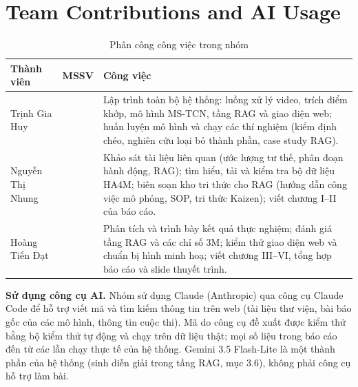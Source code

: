 \section{Team Contributions and AI Usage}

\begin{table}[H]
\centering
\caption{Phân công công việc trong nhóm}
\small
\setlength{\tabcolsep}{3pt}\renewcommand{\arraystretch}{1.15}
\begin{tabular}{@{}>{\raggedright\arraybackslash}p{}>{\centering\arraybackslash}p{}>{\raggedright\arraybackslash}p{}@{}}
\toprule
\textbf{Thành viên} & \textbf{MSSV} & \textbf{Công việc} \\\midrule
Trịnh Gia Huy & 23010069 & Lập trình toàn bộ hệ thống: luồng xử lý video, trích điểm khớp, mô hình MS-TCN, tầng RAG và giao diện web; huấn luyện mô hình và chạy các thí nghiệm (kiểm định chéo, nghiên cứu loại bỏ thành phần, case study RAG). \\
Nguyễn Thị Nhung & 23010607 & Khảo sát tài liệu liên quan (ước lượng tư thế, phân đoạn hành động, RAG); tìm hiểu, tải và kiểm tra bộ dữ liệu HA4M; biên soạn kho tri thức cho RAG (hướng dẫn công việc mô phỏng, SOP, tri thức Kaizen); viết chương I–II của báo cáo. \\
Hoàng Tiến Đạt & 23010864 & Phân tích và trình bày kết quả thực nghiệm; đánh giá tầng RAG và các chỉ số 3M; kiểm thử giao diện web và chuẩn bị hình minh hoạ; viết chương III–VI, tổng hợp báo cáo và slide thuyết trình. \\
\bottomrule
\end{tabular}
\end{table}

\textbf{Sử dụng công cụ AI.} Nhóm sử dụng Claude (Anthropic) qua công cụ Claude Code để hỗ trợ viết mã và tìm kiếm thông tin trên web (tài liệu thư viện, bài báo gốc của các mô hình, thông tin cuộc thi). Mã do công cụ đề xuất được kiểm thử bằng bộ kiểm thử tự động và chạy trên dữ liệu thật; mọi số liệu trong báo cáo đến từ các lần chạy thực tế của hệ thống. Gemini 3.5 Flash-Lite là một thành phần của hệ thống (sinh diễn giải trong tầng RAG, mục 3.6), không phải công cụ hỗ trợ làm bài.
